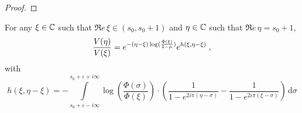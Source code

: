 \documentclass[11pt]{amsart}
\renewcommand{\Re}{\mathfrak{R}e}
\newcommand{\diff}{\,\mathrm{d}}
\begin{document}
\begin{proof}
\end{proof}

\begin{lemma}
   For any $\xi \in \mathbb{C}$ such that $\Re \,\xi\in (s_0, s_0+1)$ and $\eta \in \mathbb{C}$ such that $\Re \, \eta = s_0+1$,
\begin{equation}
    \label{eq:ARMAC.25}
    \frac{V(\eta)}{V(\xi)} 
    = e^{-(\eta-\xi) \log(\frac{\Phi(\xi)}{1-\mu})}e^{h(\xi, \eta-\xi)}
    \; ,
\end{equation}
with 
\begin{equation*}
    h(\xi, \eta-\xi) =    - \int\limits_{s_0+\varepsilon-i\infty}^{s_0+\varepsilon+i\infty}
    \log \left( \frac{\Phi(\sigma)}{\Phi(\xi)}\right)
    \cdot 
    \left(
        \frac{1}{1-e^{2i\pi(\eta-\sigma)}} - \frac{1}{1-e^{2i\pi(\xi-\sigma)}}
     \right) \diff \sigma 
\end{equation*}
\end{lemma}
\end{document}
